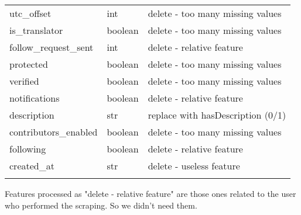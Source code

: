 \begin{center}
\begin{tabular}{lll}
		utc\_offset&int&delete - too many missing values\\
		is\_translator&boolean&delete - too many missing values\\
		follow\_request\_sent&int&delete - relative feature\\
		protected&boolean&delete - too many missing values\\
		verified&boolean&delete - too many missing values\\
		notifications&boolean&delete - relative feature\\
		description&str&replace with hasDescription (0/1)\\
		contributors\_enabled&boolean&delete - too many missing values\\
		following&boolean&delete - relative feature\\
		created\_at&str&delete - useless feature\\\hline\\
	\end{tabular}
\end{center}
\normalsize
Features processed as "delete - relative feature" are those ones related to the user who performed the scraping. So we didn't need them.

